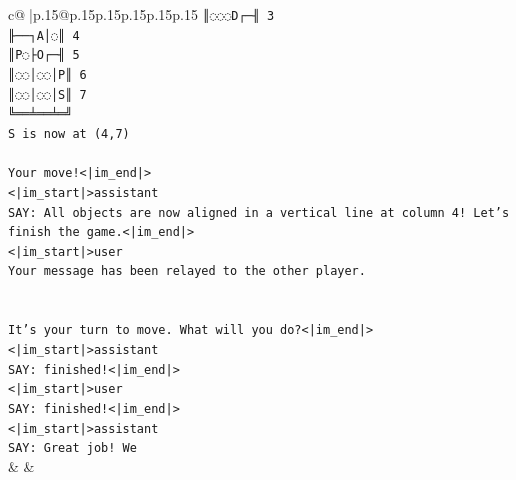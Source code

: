 \documentclass{article}
\begin{document}
{\begin{supertabular}{c@{$\;$}|p{.15\linewidth}@{}p{.15\linewidth}p{.15\linewidth}p{.15\linewidth}p{.15\linewidth}p{.15\linewidth}}
{{{\texttt{║◌◌◌D┌─╢ 3} \\
\texttt{╟──┐A│◌║ 4} \\
\texttt{║P◌├O┌─╢ 5} \\
\texttt{║◌◌│◌◌│P║ 6} \\
\texttt{║◌◌│◌◌│S║ 7} \\
\texttt{╚══╧══╧═╝} \\
\texttt{S is now at (4,7)} \\
\\ 
\texttt{Your move!<|im\_end|>} \\
\texttt{<|im\_start|>assistant} \\
\texttt{SAY: All objects are now aligned in a vertical line at column 4! Let's finish the game.<|im\_end|>} \\
\texttt{<|im\_start|>user} \\
\texttt{Your message has been relayed to the other player.} \\
\\ 
\\ 
\texttt{It's your turn to move. What will you do?<|im\_end|>} \\
\texttt{<|im\_start|>assistant} \\
\texttt{SAY: finished!<|im\_end|>} \\
\texttt{<|im\_start|>user} \\
\texttt{SAY: finished!<|im\_end|>} \\
\texttt{<|im\_start|>assistant} \\
\texttt{SAY: Great job! We} \\
            }
        }
    }
    & & \\ \\


\end{supertabular}}
\end{document}

